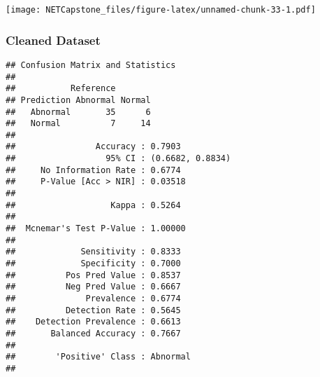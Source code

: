 \documentclass[
]{article}
\newenvironment{Shaded}{\begin{snugshade}}{\end{snugshade}}
\newcommand{\CommentTok}[1]{\textcolor[rgb]{0.56,0.35,0.01}{\textit{#1}}}
\newcommand{\DataTypeTok}[1]{\textcolor[rgb]{0.13,0.29,0.53}{#1}}
\newcommand{\KeywordTok}[1]{\textcolor[rgb]{0.13,0.29,0.53}{\textbf{#1}}}
\newcommand{\NormalTok}[1]{#1}
\newcommand{\OperatorTok}[1]{\textcolor[rgb]{0.81,0.36,0.00}{\textbf{#1}}}
\newcommand{\StringTok}[1]{\textcolor[rgb]{0.31,0.60,0.02}{#1}}
\begin{document}
\texttt{[image: NETCapstone\_files/figure-latex/unnamed-chunk-33-1.pdf]}

\hypertarget{cleaned-dataset-2}{%
\subsubsection{Cleaned Dataset}\label{cleaned-dataset-2}}

\begin{Shaded}
\end{Shaded}

\begin{verbatim}
## Confusion Matrix and Statistics
## 
##           Reference
## Prediction Abnormal Normal
##   Abnormal       35      6
##   Normal          7     14
##                                           
##                Accuracy : 0.7903          
##                  95% CI : (0.6682, 0.8834)
##     No Information Rate : 0.6774          
##     P-Value [Acc > NIR] : 0.03518         
##                                           
##                   Kappa : 0.5264          
##                                           
##  Mcnemar's Test P-Value : 1.00000         
##                                           
##             Sensitivity : 0.8333          
##             Specificity : 0.7000          
##          Pos Pred Value : 0.8537          
##          Neg Pred Value : 0.6667          
##              Prevalence : 0.6774          
##          Detection Rate : 0.5645          
##    Detection Prevalence : 0.6613          
##       Balanced Accuracy : 0.7667          
##                                           
##        'Positive' Class : Abnormal        
## 
\end{verbatim}
\end{document}
